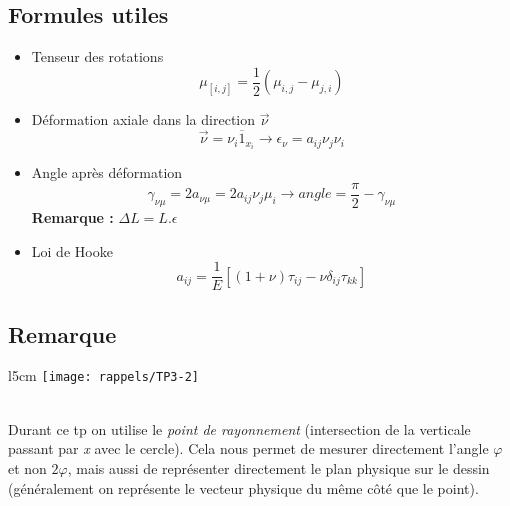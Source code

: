 \subsection*{Formules utiles}
\begin{itemize}
	\item Tenseur des rotations
	      \begin{equation}
	      	\mu _{[i,j]} = \frac{1}{2}(\mu _{i,j} - \mu _{j,i})
	      \end{equation}
	      		
	\item Déformation axiale dans la direction $\vec{\nu}$
	      \begin{equation}
	      	\vec{\nu} = \nu _i \overline{1}_{x_i} \rightarrow \epsilon _{\nu} = a_{ij} \nu _j \nu _i
	      \end{equation}
	      		
	\item	Angle après déformation 
	      \begin{equation}
	      	\gamma _{\nu \mu} = 2 a_{\nu \mu} = 2 a_{ij} \nu _j \mu _i \rightarrow angle = \frac{\pi}{2} - \gamma _{\nu \mu} 
	      \end{equation}
	      \textbf{Remarque :} $\Delta L = L.\epsilon$		
	\item Loi de Hooke
	      \begin{equation}
	      	a_{ij} = \frac{1}{E}[(1+\nu)\tau _{ij} - \nu \delta _{ij}\tau _{kk}]
	      \end{equation}							
\end{itemize}

\subsection*{Remarque}
\begin{wrapfigure}[7]{l}{5cm}
	\texttt{[image: rappels/TP3-2]}
\end{wrapfigure}
\ \\ Durant ce tp on utilise le \textit{point de rayonnement} (intersection de la verticale passant par \textit{x} avec le cercle). Cela nous permet de mesurer directement l'angle $\varphi$ et non $2 \varphi$, mais aussi de représenter directement le plan physique sur le dessin (généralement on représente le vecteur physique du même côté que le point).\\


